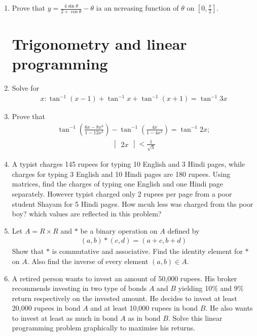 \documentclass[12pt,-letter paper]{article}
\newcommand{\mydet}[1]{\ensuremath{\begin{vmatrix}#1\end{vmatrix}}}
\providecommand{\brak}[1]{\ensuremath{\left(#1\right)}}
\providecommand{\sbrak}[1]{\ensuremath{{}\left[#1\right]}}
\providecommand{\brak}[1]{\ensuremath{\left(#1\right)}}
\begin{document}
\begin{enumerate}
	\item Prove that $ y = \frac{4\sin \theta}{2+ \cos \theta} - \theta$ ia an ncreasing function of $\theta$ on $\sbrak{0,\frac{\pi}{2}}$.

\section{Trigonometry and linear programming}
	\item Solve for 
	\begin{align}
		x: \tan^{-1}(x-1) + \tan^{-1}x + \tan^{-1}(x+1) = \tan^{-1}3x
	\end{align}

	\item Prove that 
	\begin{align}
	\tan^{-1} \brak{\frac{6x-8x^{3}}{1-12x^{2}}} - \tan^{-1} \brak{\frac{4x}{1-4x^{2}}} = \tan^{-1}2x;
	\end{align}
	\begin{align}
		\mydet{2x} < \frac{1}{\sqrt{3}}
	\end{align}

	\item A typist charges 145 rupees for typing 10 English and 3 Hindi pages, while charges for typing 3 English and 10 Hindi pages are 180 rupees. Using matrices, 
find the charges of typing one English and one Hindi page separately. 
However typist charged only 2 rupees per page from a poor student Shayam for 5 Hindi pages.
How mcuh less was charged from ths poor boy? which values are reflected in this problem?

	\item Let $A = R \times R$ and $*$ be a binary operation on $A$ defined by
	\begin{align}
		(a, b) * (c, d) = (a + c, b + d)
	\end{align}
Show that $*$ is commutative and associative. Find the identity element for $*$
on $A$. Also find the inverse of every element $(a, b) \in A$.
	
	\item  A retired person wants to invest an amount of 50,000 rupees. His broker recommends investing in two type of bonds $A$ and $B$ yielding 10\% and 9\% return respectively on the invested amount. He decides to invest at least
20,000 rupees in bond $A$ and at least 10,000 rupees in bond $B$. He also wants to invest at least as much in bond $A$ as in bond $B$. Solve this linear programming problem graphically to maximise his returns.


\end{enumerate}
\end{document}
